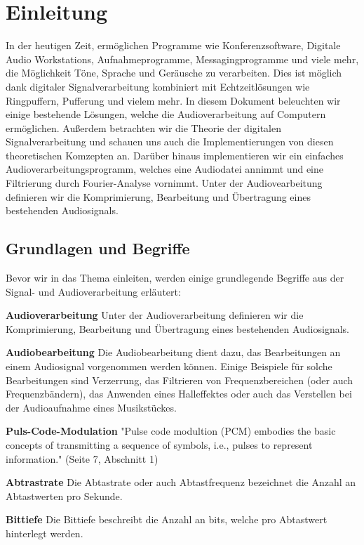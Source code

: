 \documentclass[paper=a4,fontsize=12pt,ngerman]{scrartcl}
\begin{document}
\section{Einleitung}
In der heutigen Zeit, ermöglichen Programme wie Konferenzsoftware, Digitale Audio Workstations, Aufnahmeprogramme, Messagingprogramme und viele mehr, die
Möglichkeit Töne, Sprache und Geräusche zu verarbeiten. Dies ist möglich dank
digitaler Signalverarbeitung kombiniert mit Echtzeitlösungen wie Ringpuffern, Pufferung und vielem mehr. In diesem Dokument beleuchten wir einige bestehende
Lösungen, welche die Audioverarbeitung auf Computern ermöglichen. Außerdem betrachten wir die Theorie der digitalen Signalverarbeitung und schauen uns auch die
Implementierungen von diesen theoretischen Komzepten an. Darüber hinaus implementieren wir ein einfaches Audioverarbeitungsprogramm, welches eine Audiodatei
annimmt und eine Filtrierung durch Fourier-Analyse vornimmt. Unter der Audiovearbeitung definieren wir die Komprimierung, Bearbeitung und Übertragung eines
bestehenden Audiosignals.


\subsection{Grundlagen und Begriffe}

Bevor wir in das Thema einleiten, werden einige grundlegende Begriffe aus der Signal- und Audioverarbeitung erläutert:

\textbf{Audioverarbeitung}
Unter der Audioverarbeitung definieren wir die Komprimierung, Bearbeitung und
Übertragung eines bestehenden Audiosignals.

\textbf{Audiobearbeitung}
Die Audiobearbeitung dient dazu, das Bearbeitungen an einem Audiosignal vorgenommen werden können. Einige Beispiele für solche Bearbeitungen sind Verzerrung,
das Filtrieren von Frequenzbereichen (oder auch Frequenzbändern), das Anwenden
eines Halleffektes oder auch das Verstellen bei der Audioaufnahme eines Musikstückes.

\textbf{Puls-Code-Modulation}
"Pulse code modultion (PCM) embodies the basic concepts of transmitting a sequence of symbols, i.e., pulses to represent information." \cite{waggener1995pulse} (Seite 7, Abschnitt 1)

\textbf{Abtrastrate}
Die Abtastrate oder auch Abtastfrequenz bezeichnet die Anzahl an Abtastwerten
pro Sekunde. \cite{knapp2023bituebertragung, oppenheim2013discrete}

\textbf{Bittiefe}
Die Bittiefe beschreibt die Anzahl an bits, welche pro Abtastwert hinterlegt werden. \cite{knapp2023bituebertragung, oppenheim2013discrete}
\end{document}
